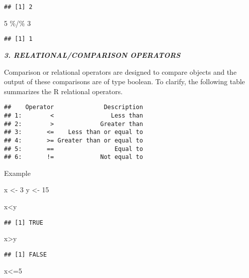 \documentclass[
]{article}
\newenvironment{Shaded}{\begin{snugshade}}{\end{snugshade}}
\newcommand{\DecValTok}[1]{\textcolor[rgb]{0.00,0.00,0.81}{#1}}
\newcommand{\NormalTok}[1]{#1}
\newcommand{\OtherTok}[1]{\textcolor[rgb]{0.56,0.35,0.01}{#1}}
\newcommand{\SpecialCharTok}[1]{\textcolor[rgb]{0.00,0.00,0.00}{#1}}
\begin{document}
\begin{verbatim}
## [1] 2
\end{verbatim}

\begin{Shaded}
\begin{Highlighting}[]
\DecValTok{5} \SpecialCharTok{\%/\%} \DecValTok{3}
\end{Highlighting}
\end{Shaded}

\begin{verbatim}
## [1] 1
\end{verbatim}

\textbf{\emph{3. RELATIONAL/COMPARISON OPERATORS}}

Comparison or relational operators are designed to compare objects and
the output of these comparisons are of type boolean. To clarify, the
following table summarizes the R relational operators.

\begin{verbatim}
##    Operator              Description
## 1:        <                Less than
## 2:        >             Greater than
## 3:       <=    Less than or equal to
## 4:       >= Greater than or equal to
## 5:       ==                 Equal to
## 6:       !=             Not equal to
\end{verbatim}

Example

\begin{Shaded}
\begin{Highlighting}[]
\NormalTok{x }\OtherTok{\textless{}{-}} \DecValTok{3}
\NormalTok{y }\OtherTok{\textless{}{-}} \DecValTok{15}

\NormalTok{x}\SpecialCharTok{\textless{}}\NormalTok{y}
\end{Highlighting}
\end{Shaded}

\begin{verbatim}
## [1] TRUE
\end{verbatim}

\begin{Shaded}
\begin{Highlighting}[]
\NormalTok{x}\SpecialCharTok{\textgreater{}}\NormalTok{y}
\end{Highlighting}
\end{Shaded}

\begin{verbatim}
## [1] FALSE
\end{verbatim}

\begin{Shaded}
\begin{Highlighting}[]
\NormalTok{x}\SpecialCharTok{\textless{}=}\DecValTok{5}
\end{Highlighting}
\end{Shaded}
\end{document}
